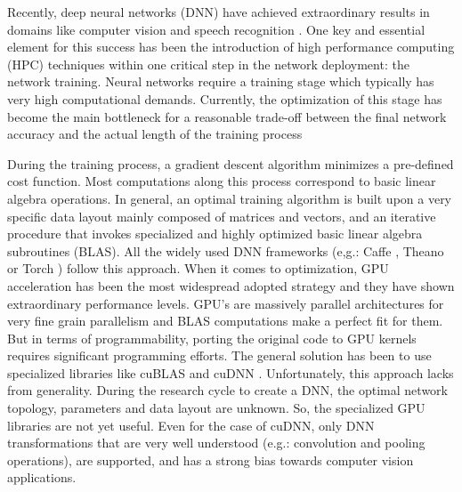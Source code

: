 Recently, deep neural networks (DNN) have achieved extraordinary 
results in domains like computer vision and speech recognition \cite{ILSVRC15, Hannun2014}. 
One key and essential element for this success
has been the introduction of high performance computing (HPC)
techniques within one critical step in the network deployment: the
network training. 
Neural networks require a training stage which typically has
very high computational demands. 
Currently, the optimization of this stage
has become the main bottleneck for a reasonable trade-off between the
final network accuracy and the actual length of the
training process \cite{JeffDean2012, Coates2013} 


During the training process, a gradient descent algorithm minimizes a pre-defined cost function. 
Most computations
along this process correspond to basic linear algebra operations. In
general, an optimal training algorithm is built upon a very specific 
data layout mainly composed of matrices and vectors, and an iterative
procedure that invokes specialized and highly optimized basic
linear algebra subroutines (BLAS).
All the widely used DNN frameworks (e,g.: Caffe \cite{Caffe}, Theano \cite{Theano} or Torch \cite{Torch}) follow this approach. 
When it comes to optimization, 
GPU acceleration has been the most widespread adopted strategy and they have
shown extraordinary performance levels. 
GPU's are massively
parallel architectures for very fine grain parallelism and BLAS
computations make a perfect fit for them. 
But in terms of programmability,
porting the original code to GPU kernels requires significant programming 
efforts. 
The general solution has been to use specialized 
libraries like cuBLAS  \cite{cuBLAS} and cuDNN \cite{cuDNN}. 
Unfortunately, this approach lacks from generality.
During the research cycle to create a DNN, the optimal network topology,
parameters and data layout are unknown. 
So, the specialized GPU libraries are not yet useful. 
Even for the case of cuDNN, 
only DNN transformations that are very well understood 
(e.g.: convolution and pooling operations),
are supported, and has a strong bias towards computer vision applications.

